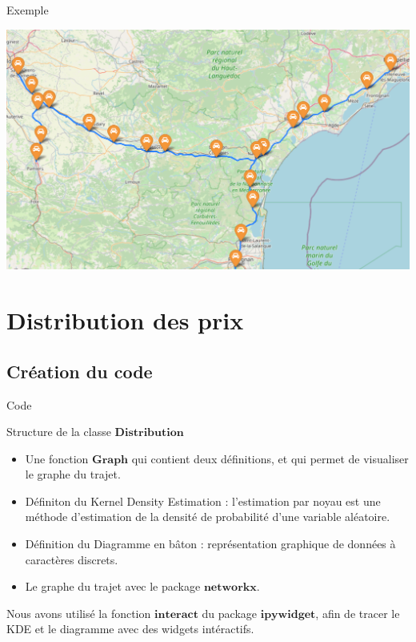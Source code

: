 \documentclass{beamer}
\begin{document}
\begin{frame}[fragile]{Exemple}
\begin{center}
\includegraphics[scale=0.3]{carte.png}
\end{center}
\end{frame}

\section{Distribution des prix}
\subsection{Création du code}

\begin{frame}[fragile]{Code}
\begin{block}{Structure de la classe $\textbf{Distribution}$ }
\end{block}
\begin{itemize}
\item Une fonction $\textbf{Graph}$ qui contient deux définitions, et qui permet de visualiser le graphe du trajet. 
\pause
\item Définiton du Kernel Density Estimation : l’estimation par noyau est une méthode d’estimation de la densité de probabilité d’une variable aléatoire. 
\pause
\item Définition du Diagramme en bâton : représentation graphique de données à caractères discrets.
\pause
\item Le graphe du trajet avec le package $\textbf{networkx}$.
\end{itemize}
\pause
Nous avons utilisé la fonction $\textbf{interact}$ du package $\textbf{ipywidget}$, afin de tracer le KDE et le diagramme avec des widgets intéractifs.
\end{frame}
\end{document}

